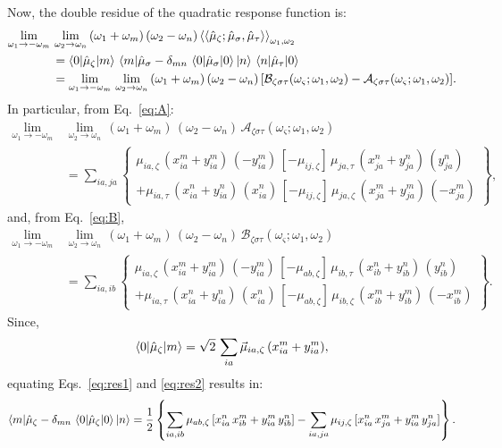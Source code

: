 \documentclass[11pt,a4paper]{article}
\begin{document}
Now, the double residue of the quadratic response function is:\begin{align}
		\lim_{\omega_1\to-\omega_m}\,&\lim_{\omega_2\to\omega_n}\,	(\omega_1+\omega_m)\,(\omega_2-\omega_n) \braket{\braket{\hat\mu_\zeta;\hat\mu_\sigma,\hat\mu_\tau}}_{\omega_1,\omega_2}\nonumber\\
		&= \braket{0|\hat\mu_\zeta|m}\,\braket{m|\hat\mu_\sigma - \delta_{mn}\,\braket{0|\hat\mu_\sigma|0}|n}\,\braket{n|\hat\mu_\tau|0} \label{eq:res1} \\
		&= 	\lim_{\omega_1\to-\omega_m}\,\lim_{\omega_2\to\omega_n}\,	(\omega_1+\omega_m)\,(\omega_2-\omega_n)\,[\mathcal B_{\zeta\sigma\tau}(\omega_\varsigma;\omega_1,\omega_2) - \mathcal A_{\zeta\sigma\tau}(\omega_\varsigma;\omega_1,\omega_2)] \label{eq:res2}.
\end{align}
In particular, from Eq.~\eqref{eq:A}:\begin{align*}
	\lim_{\omega_1\to-\omega_m}\,&\lim_{\omega_2\to\omega_n}\,	(\omega_1+\omega_m)\,(\omega_2-\omega_n)\,\mathcal A_{\zeta\sigma\tau}(\omega_\varsigma;\omega_1,\omega_2) \\
	&= \sum_{ia,ja} \left\{
	\begin{array}{l}
		\mu_{ia,\zeta}\,(x^{m}_{ia} + y^{m}_{ia})\,(-y_{ia}^m)\,[-\mu_{ij,\zeta}]\,\mu_{ja,\tau}\,(x^{n}_{ja} + y^{n}_{ja})\,(y_{ja}^n) \\
		+\mu_{ia,\tau}\,(x^{n}_{ia} + y^{n}_{ia})\,(x_{ia}^n)\,[-\mu_{ij,\zeta}]\,\mu_{ja,\zeta}\,(x^{m}_{ja} + y^{m}_{ja})\,(-x_{ja}^m)
	\end{array}
	\right\},
\end{align*}
and, from Eq.~\eqref{eq:B},
\begin{align*}
	\lim_{\omega_1\to-\omega_m}\,&\lim_{\omega_2\to\omega_n}\,	(\omega_1+\omega_m)\,(\omega_2-\omega_n)\,\mathcal B_{\zeta\sigma\tau}(\omega_\varsigma;\omega_1,\omega_2) \\
	&= \sum_{ia,ib} \left\{
	\begin{array}{l}
		\mu_{ia,\zeta}\,(x^{m}_{ia} + y^{m}_{ia})\,(-y_{ia}^m)\,[-\mu_{ab,\zeta}]\,\mu_{ib,\tau}\,(x^{n}_{ib} + y^{n}_{ib})\,(y_{ib}^n) \\
		+\mu_{ia,\tau}\,(x^{n}_{ia} + y^{n}_{ia})\,(x_{ia}^n)\,[-\mu_{ab,\zeta}]\,\mu_{ib,\zeta}\,(x^{m}_{ib} + y^{m}_{ib})\,(-x_{ib}^m)
	\end{array}
	\right\}.
\end{align*}
Since,\begin{equation*}
	\braket{0|\hat\mu_\zeta|m} =  \sqrt{2}\,\sum_{ia} \vec\mu_{ia,\zeta}\,(x^m_{ia}+y^m_{ia}),
\end{equation*}
equating Eqs.~\eqref{eq:res1} and \eqref{eq:res2} results in:\begin{equation}
	\braket{m|\hat\mu_\zeta- \delta_{mn}\,\braket{0|\hat\mu_\zeta|0}|n} = \frac{1}{2}\left\{ \sum_{ia,ib} \mu_{ab,\zeta}\,[x^n_{ia}\,x^m_{ib} + y^m_{ia}\,y^n_{ib}]  - \sum_{ia,ja} \mu_{ij,\zeta}\,[x^n_{ia}\,x^m_{ja} + y^m_{ia}\,y^n_{ja}] \right\}.
\end{equation}
	
\end{document}

